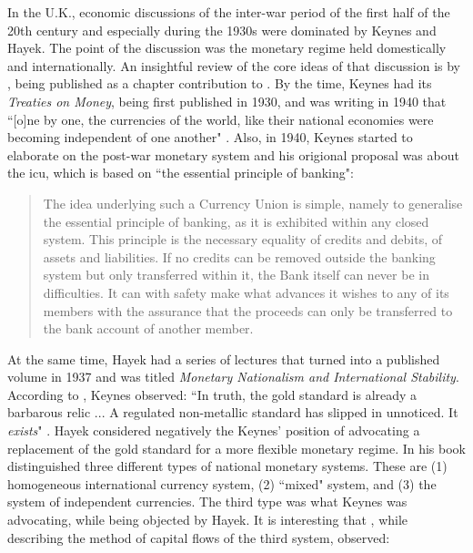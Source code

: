 In the U.K., economic discussions of the inter-war period of the first half of the 20th century and especially during the 1930s were dominated by Keynes and Hayek. The point of the discussion was the monetary regime held domestically and internationally. An insightful review of the core ideas of that discussion is by \cite{kregel1986}, being published as a chapter contribution to \cite{drukker}. By the time, Keynes had its \textit{Treaties on Money}, being first published in 1930, and was writing in 1940 that ``[o]ne by one, the currencies of the world, like their national economies were becoming independent of one another" \citep[vol.XXV p.~3]{keynes1980}. Also, in 1940, Keynes started to elaborate on the post-war monetary system and his origional proposal was about the \ac{icu}, which is based on ``the essential principle of banking":

\begin{quote}
The idea underlying such a Currency Union is simple, namely to generalise the essential principle of banking, as it is exhibited within any closed system. This principle is the necessary equality of credits and debits, of assets and liabilities. If no credits can be removed outside the banking system but only transferred within it, the Bank itself can never be in difficulties. It can with safety make what advances it wishes to any of its members with the assurance that the proceeds can only be transferred to the bank account of another member.
\citep[vol.XXV p.~3]{keynes1980}
\end{quote}

At the same time, Hayek had a series of lectures that turned into a published volume in 1937 and was titled \textit{Monetary Nationalism and International Stability}. According to \citeauthor{kregel1986}, Keynes observed: ``In truth, the gold standard is already a barbarous relic ... A regulated non-metallic standard has slipped in unnoticed. It \textit{exists}" \citeauthor[p.~34, emphasis original]{kregel1986}.
Hayek considered negatively the Keynes' position of advocating a replacement of the gold standard for a more flexible monetary regime.
In his book \citeauthor{hayek1937} distinguished three different types of national monetary systems.
These are (1) homogeneous international currency system, (2) ``mixed" system, and (3) the system of independent currencies.  The third type was what Keynes was advocating, while being objected by Hayek. It is interesting that \citeauthor{hayek1937}, while describing the method of capital flows of the third system, observed: 


